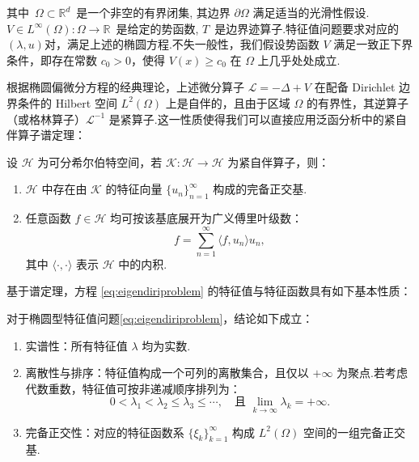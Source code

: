其中~$\Omega \subset \mathbb{R}^{d}$~是一个非空的有界闭集, 其边界 $\partial \Omega$ 满足适当的光滑性假设.$V\in L^{\infty}(\Omega): \Omega \rightarrow \mathbb{R}$~是给定的势函数, $T$~是边界迹算子.特征值问题要求对应的$(\lambda, u)$对，满足上述的椭圆方程.不失一般性，我们假设势函数 $V$ 满足一致正下界条件，即存在常数 $c_0 > 0$，使得 $V(x) \ge c_0$ 在 $\Omega$ 上几乎处处成立.

根据椭圆偏微分方程的经典理论，上述微分算子 $\mathcal{L} = -\Delta + V$ 在配备 Dirichlet 边界条件的 Hilbert 空间 $L^2(\Omega)$ 上是自伴的，且由于区域 $\Omega$ 的有界性，其逆算子（或格林算子）$\mathcal{L}^{-1}$ 是紧算子.这一性质使得我们可以直接应用泛函分析中的紧自伴算子谱定理：

\begin{theorem}
设 $\mathcal{H}$ 为可分希尔伯特空间，若 $\mathcal{K}: \mathcal{H} \to \mathcal{H}$ 为紧自伴算子，则：
\begin{enumerate}
    \item $\mathcal{H}$ 中存在由 $\mathcal{K}$ 的特征向量 $\{u_n\}_{n=1}^{\infty}$ 构成的完备正交基.
    \item 任意函数 $f \in \mathcal{H}$ 均可按该基底展开为广义傅里叶级数：
    $$ f = \sum_{n=1}^{\infty} \langle f, u_n \rangle u_n, $$
    其中 $\langle \cdot, \cdot \rangle$ 表示 $\mathcal{H}$ 中的内积.
\end{enumerate}
\end{theorem}

基于谱定理，方程 \eqref{eq:eigendiriproblem} 的特征值与特征函数具有如下基本性质：

\begin{lemma}\label{lemma:eigen_properties}
对于椭圆型特征值问题\eqref{eq:eigendiriproblem}，结论如下成立\cite{evans2010partial}：
\begin{enumerate}
    \item {\heiti 实谱性}：所有特征值 $\lambda$ 均为实数.
    \item {\heiti 离散性与排序}：特征值构成一个可列的离散集合，且仅以 $+\infty$ 为聚点.若考虑代数重数，特征值可按非递减顺序排列为：
    \begin{equation}\label{eq:eigenvalue_sequence}
    0 < \lambda_{1} < \lambda_{2} \leq \lambda_{3} \leq \cdots, \quad \text{且 } \lim_{k \to \infty} \lambda_{k} = +\infty.
    \end{equation}
    \item {\heiti 完备正交性}：对应的特征函数系 $\{\xi_{k}\}_{k=1}^{\infty}$ 构成 $L^{2}(\Omega)$ 空间的一组完备正交基.
\end{enumerate}
\end{lemma}

